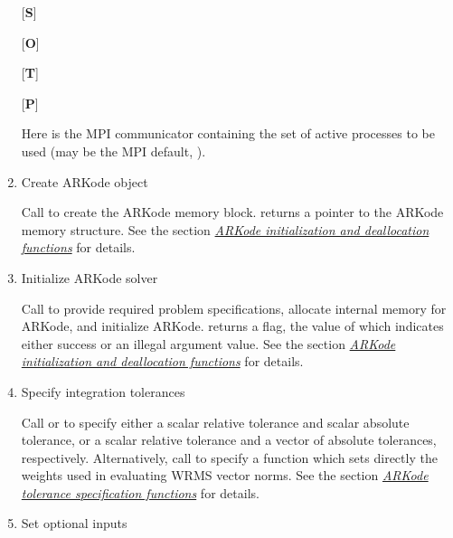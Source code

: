 \documentclass[letterpaper,10pt,english]{sphinxmanual}
\begin{document}
\begin{enumerate}
{[}\textbf{S}{]} 

{[}\textbf{O}{]} 

{[}\textbf{T}{]} 

{[}\textbf{P}{]} 

Here  is the MPI communicator containing the set of active
processes to be used (may be the MPI default, ).

\item {} 
Create ARKode object

Call  to create the ARKode memory
block. {\hyperref[c_interface/User_callable:ARKodeCreate]{}} returns a pointer to the ARKode memory
structure. See the section {\hyperref[c_interface/User_callable:cinterface-initialization]{\emph{ARKode initialization and deallocation functions}}} for
details.

\item {} 
Initialize ARKode solver

Call {\hyperref[c_interface/User_callable:ARKodeInit]{}} to provide required problem specifications,
allocate internal memory for ARKode, and initialize
ARKode. {\hyperref[c_interface/User_callable:ARKodeInit]{}} returns a flag, the value of which indicates
either success or an illegal argument value. See the section
{\hyperref[c_interface/User_callable:cinterface-initialization]{\emph{ARKode initialization and deallocation functions}}} for details.

\item {} 
Specify integration tolerances

Call {\hyperref[c_interface/User_callable:ARKodeSStolerances]{}} or {\hyperref[c_interface/User_callable:ARKodeSVtolerances]{}} to
specify either a scalar relative tolerance and scalar absolute
tolerance, or a scalar relative tolerance and a vector of absolute
tolerances, respectively. Alternatively, call {\hyperref[c_interface/User_callable:ARKodeWFtolerances]{}}
to specify a function which sets directly the weights used in
evaluating WRMS vector norms. See the section
{\hyperref[c_interface/User_callable:cinterface-tolerances]{\emph{ARKode tolerance specification functions}}} for details.

\item {} 
Set optional inputs


\end{enumerate}
\end{document}
